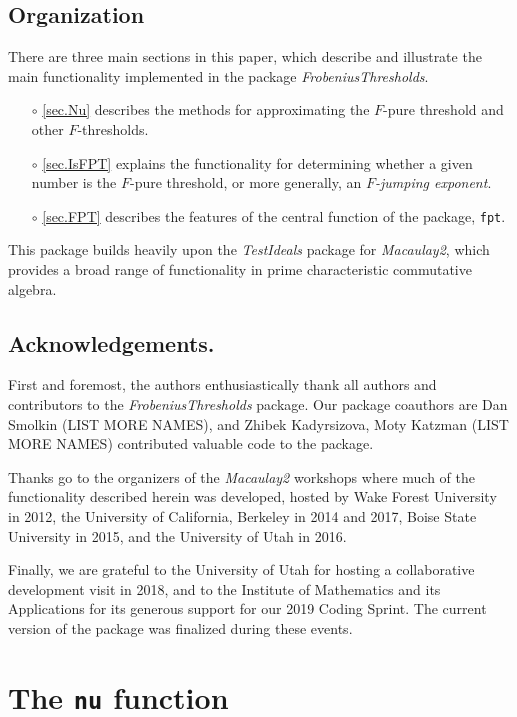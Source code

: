 \documentclass{amsart}
\begin{document}
\subsection*{Organization}

There are three main sections in this paper, which describe and illustrate the main functionality implemented in the package \emph{FrobeniusThresholds}.
\begin{itemize}
\item[$\circ$] \autoref{sec.Nu} describes the methods for approximating the $F$-pure threshold and other $F$-thresholds.  
\item[$\circ$] \autoref{sec.IsFPT} explains the functionality for determining whether a given number is the $F$-pure threshold, or more generally, an \emph{$F$-jumping exponent}.
\item[$\circ$] \autoref{sec.FPT} describes the features of the central function of the package, {\tt fpt}. 
\end{itemize}
This package builds heavily upon the \emph{TestIdeals} package for \emph{Macaulay2}, which provides a broad range of functionality in prime characteristic commutative algebra. 

\subsection*{Acknowledgements.}  First and foremost, the authors enthusiastically thank all authors and contributors to the \emph{FrobeniusThresholds} package.
Our package coauthors are Dan Smolkin (LIST MORE NAMES), and Zhibek Kadyrsizova, Moty Katzman (LIST MORE NAMES) contributed valuable code to the package. 

Thanks go to the organizers of the \emph{Macaulay2} workshops where much of the functionality described herein was developed, hosted by Wake Forest University in 2012, the University of California, Berkeley in 2014 and 2017, Boise State University in 2015, and the University of Utah in 2016. 

Finally, we are grateful to the University of Utah for hosting a collaborative development visit in 2018, and to the Institute of Mathematics and its Applications for its generous support for our 2019 Coding Sprint. 
The current version of the package was finalized during these events.

\section{The {\tt nu} function}
\label{sec.Nu}
\end{document}
